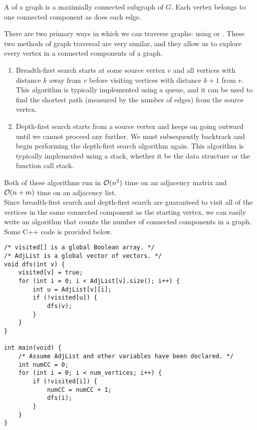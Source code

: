 \begin{definition}
A  of a graph is a maximially connected subgraph of $G$. Each vertex belongs to one connected component as does each edge.
\end{definition}

There are two primary ways in which we can traverse graphs: using  or . These two methods of graph traversal are very similar, and they allow us to explore every vertex in a connected components of a graph. 


\begin{enumerate}
    \item Breadth-first search starts at some source vertex $v$ and all vertices with distance $k$ away from $v$ before visiting vertices with distance $k + 1$ from $v$. This algorithm is typically implemented using a queue, and it can be used to find the shortest path (measured by the number of edges) from the source vertex.
    \item Depth-first search starts from a source vertex and keeps on going outward until we cannot proceed any further. We must subsequently backtrack and begin performing the depth-first search algorithm again.  This algorithm is typically implemented using a stack, whether it be the data structure or the function call stack.
\end{enumerate}

Both of these algorithms run in $\mathcal{O}(n^2)$ time on an adjacency matrix and $\mathcal{O}(n + m)$ time on an adjacency list. \\

Since breadth-first search and depth-first search are guaranteed to visit all of the vertices in the same connected component as the starting vertex, we can easily write an algorithm that counts the number of connected components in a graph. \\

Some C++ code is provided below.


\begin{lstlisting}
/* visited[] is a global Boolean array. */
/* AdjList is a global vector of vectors. */
void dfs(int v) {
    visited[v] = true;
    for (int i = 0; i < AdjList[v].size(); i++) {
        int u = AdjList[v][i];
        if (!visited[u]) {
            dfs(v);
        }
    }
}

int main(void) {
    /* Assume AdjList and other variables have been declared. */
    int numCC = 0;
    for (int i = 0; i < num_vertices; i++) {
        if (!visited[i]) {
            numCC = numCC + 1;
            dfs(i);
        }
    }
}
\end{lstlisting}